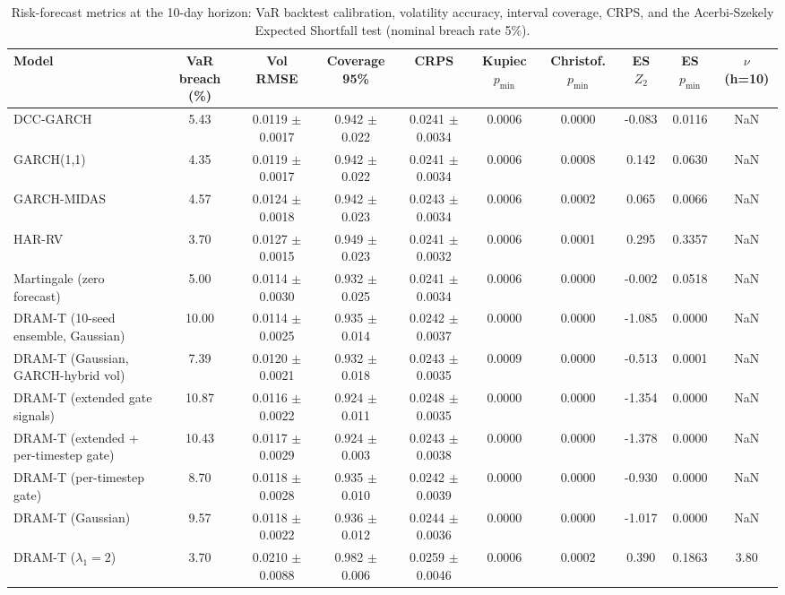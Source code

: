 \begin{table}
\caption{Risk-forecast metrics at the 10-day horizon: VaR backtest calibration, volatility accuracy, interval coverage, CRPS, and the Acerbi-Szekely Expected Shortfall test (nominal breach rate 5\%).}
\label{tab:risk}
\begin{tabular}{lccccccccc}
\toprule
Model & VaR breach (\%) & Vol RMSE & Coverage 95\% & CRPS & Kupiec $p_{\min}$ & Christof. $p_{\min}$ & ES $Z_2$ & ES $p_{\min}$ & $\nu$ (h=10) \\
\midrule
DCC-GARCH & 5.43 & 0.0119 $\pm$ 0.0017 & 0.942 $\pm$ 0.022 & 0.0241 $\pm$ 0.0034 & 0.0006 & 0.0000 & -0.083 & 0.0116 & NaN \\
GARCH(1,1) & 4.35 & 0.0119 $\pm$ 0.0017 & 0.942 $\pm$ 0.022 & 0.0241 $\pm$ 0.0034 & 0.0006 & 0.0008 & 0.142 & 0.0630 & NaN \\
GARCH-MIDAS & 4.57 & 0.0124 $\pm$ 0.0018 & 0.942 $\pm$ 0.023 & 0.0243 $\pm$ 0.0034 & 0.0006 & 0.0002 & 0.065 & 0.0066 & NaN \\
HAR-RV & 3.70 & 0.0127 $\pm$ 0.0015 & 0.949 $\pm$ 0.023 & 0.0241 $\pm$ 0.0032 & 0.0006 & 0.0001 & 0.295 & 0.3357 & NaN \\
Martingale (zero forecast) & 5.00 & 0.0114 $\pm$ 0.0030 & 0.932 $\pm$ 0.025 & 0.0241 $\pm$ 0.0034 & 0.0006 & 0.0000 & -0.002 & 0.0518 & NaN \\
DRAM-T (10-seed ensemble, Gaussian) & 10.00 & 0.0114 $\pm$ 0.0025 & 0.935 $\pm$ 0.014 & 0.0242 $\pm$ 0.0037 & 0.0000 & 0.0000 & -1.085 & 0.0000 & NaN \\
DRAM-T (Gaussian, GARCH-hybrid vol) & 7.39 & 0.0120 $\pm$ 0.0021 & 0.932 $\pm$ 0.018 & 0.0243 $\pm$ 0.0035 & 0.0009 & 0.0000 & -0.513 & 0.0001 & NaN \\
DRAM-T (extended gate signals) & 10.87 & 0.0116 $\pm$ 0.0022 & 0.924 $\pm$ 0.011 & 0.0248 $\pm$ 0.0035 & 0.0000 & 0.0000 & -1.354 & 0.0000 & NaN \\
DRAM-T (extended + per-timestep gate) & 10.43 & 0.0117 $\pm$ 0.0029 & 0.924 $\pm$ 0.003 & 0.0243 $\pm$ 0.0038 & 0.0000 & 0.0000 & -1.378 & 0.0000 & NaN \\
DRAM-T (per-timestep gate) & 8.70 & 0.0118 $\pm$ 0.0028 & 0.935 $\pm$ 0.010 & 0.0242 $\pm$ 0.0039 & 0.0000 & 0.0000 & -0.930 & 0.0000 & NaN \\
DRAM-T (Gaussian) & 9.57 & 0.0118 $\pm$ 0.0022 & 0.936 $\pm$ 0.012 & 0.0244 $\pm$ 0.0036 & 0.0000 & 0.0000 & -1.017 & 0.0000 & NaN \\
DRAM-T ($\lambda_1=2$) & 3.70 & 0.0210 $\pm$ 0.0088 & 0.982 $\pm$ 0.006 & 0.0259 $\pm$ 0.0046 & 0.0006 & 0.0002 & 0.390 & 0.1863 & 3.80 \\

\end{tabular}
\end{table}
